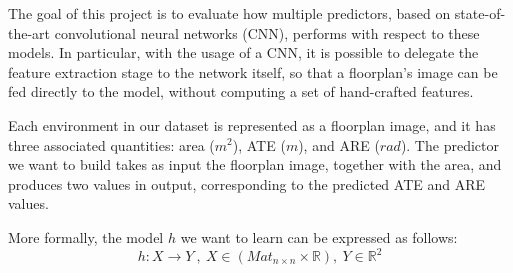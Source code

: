 \noindent
The goal of this project is to evaluate how multiple predictors, based on state-of-the-art convolutional neural networks (CNN), performs with respect to these models. In particular, with the usage of a CNN, it is possible to delegate the feature extraction stage to the network itself, so that a floorplan's image can be fed directly to the model, without computing a set of hand-crafted features.


\noindent
Each environment in our dataset is represented as a floorplan image, and it has three associated quantities: area ($m^2$), ATE ($m$), and ARE ($rad$). The predictor we want to build takes as input the floorplan image, together with the area, and produces two values in output, corresponding to the predicted ATE and ARE values.

\noindent
More formally, the model $h$ we want to learn can be expressed as follows:
$$
    h: X \rightarrow Y\ ,\ X\in (Mat_{n \times n}\times\mathbb{R}),\ Y\in\mathbb{R}^2 
$$